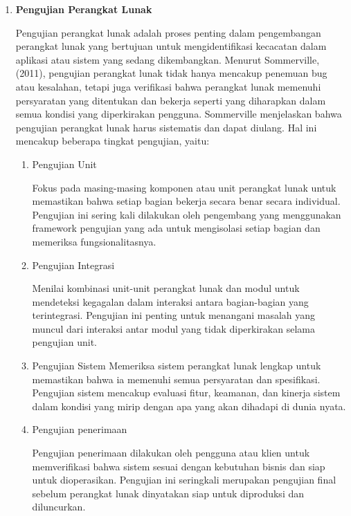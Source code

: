 \documentclass[12pt]{article}
\newcommand{\listsection}[1]{
    \item \textbf{#1}
    \addcontentsline{toc}{subsection}{#1}
}
\begin{document}
\begin{enumerate}[label=\textbf{3.\arabic*}]
    \listsection{Pengujian Perangkat Lunak}

    Pengujian perangkat lunak adalah proses penting dalam pengembangan perangkat lunak yang bertujuan untuk mengidentifikasi kecacatan dalam aplikasi atau sistem yang sedang dikembangkan. Menurut Sommerville, (2011), pengujian perangkat lunak tidak hanya mencakup penemuan bug atau kesalahan, tetapi juga verifikasi bahwa perangkat lunak memenuhi persyaratan yang ditentukan dan bekerja seperti yang diharapkan dalam semua kondisi yang diperkirakan pengguna. Sommerville menjelaskan bahwa pengujian perangkat lunak harus sistematis dan dapat diulang. Hal ini mencakup beberapa tingkat pengujian, yaitu:


    \begin{enumerate}[label=\arabic*.]
        \item Pengujian Unit
        
        Fokus pada masing-masing komponen atau unit perangkat lunak untuk memastikan bahwa setiap bagian bekerja secara benar secara individual. Pengujian ini sering kali dilakukan oleh pengembang yang menggunakan framework pengujian yang ada untuk mengisolasi setiap bagian dan memeriksa fungsionalitasnya.

        \item Pengujian Integrasi
        
        Menilai kombinasi unit-unit perangkat lunak dan modul untuk mendeteksi kegagalan dalam interaksi antara bagian-bagian yang terintegrasi. Pengujian ini penting untuk menangani masalah yang muncul dari interaksi antar modul yang tidak diperkirakan selama pengujian unit.

        \item Pengujian Sistem
        Memeriksa sistem perangkat lunak lengkap untuk memastikan bahwa ia memenuhi semua persyaratan dan spesifikasi. Pengujian sistem mencakup evaluasi fitur, keamanan, dan kinerja sistem dalam kondisi yang mirip dengan apa yang akan dihadapi di dunia nyata.

        \item Pengujian penerimaan
        
        Pengujian penerimaan dilakukan oleh pengguna atau klien untuk memverifikasi bahwa sistem sesuai dengan kebutuhan bisnis dan siap untuk dioperasikan. Pengujian ini seringkali merupakan pengujian final sebelum perangkat lunak dinyatakan siap untuk diproduksi dan diluncurkan.
        
    \end{enumerate}
\end{enumerate}
\end{document}
